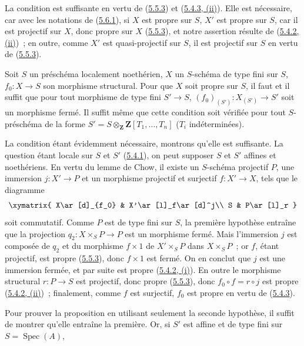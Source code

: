La condition est suffisante en vertu de (\hyperref[II.5.5.3-fr]{5.5.3}) et
(\hyperref[II.5.4.3-fr]{5.4.3, (ii)}). Elle est nécessaire, car avec les
notations de (\hyperref[II.5.6.1-fr]{5.6.1}), si $X$ est propre sur $S$, $X'$
est propre sur $S$, car il est projectif sur $X$, donc propre sur $X$
(\hyperref[II.5.5.3-fr]{5.5.3}), et notre assertion résulte de
(\hyperref[II.5.4.2-fr]{5.4.2, (ii)})~; en outre, comme $X'$ est
quasi-projectif sur $S$, il est projectif sur $S$ en vertu de
(\hyperref[II.5.5.3-fr]{5.5.3}).

\begin{corollary}[5.6.3]
\label{II.5.6.3-fr}
Soit $S$ un préschéma localement noethérien, $X$ un $S$-schéma de type fini
sur $S$, $f_0:X\to S$ son morphisme structural. Pour que $X$ soit propre sur
$S$, il faut et il suffit que pour tout morphisme de type fini $S'\to S$,
$(f_0)_{(S')}:X_{(S')}\to S'$ soit un morphisme fermé. Il suffit même que
cette condition soit vérifiée pour tout $S$-préschéma de la forme
$S'=S\otimes_{\mathbf Z}\mathbf Z[T_1,\ldots,T_n]$ ($T_i$ indéterminées).
\end{corollary}

La condition étant évidemment nécessaire, montrons qu'elle est suffisante.
La question étant locale sur $S$ et $S'$ (\hyperref[II.5.4.1-fr]{5.4.1}), on
peut supposer $S$ et $S'$ affines et noethériens. En vertu du lemme de Chow,
il existe un $S$-schéma projectif $P$, une immersion $j:X'\to P$ et un
morphisme projectif et surjectif $f:X'\to X$, tels que le diagramme
\[
\xymatrix{
X\ar[d]_{f_0} & X'\ar[l]_f\ar[d]^j\\
S & P\ar[l]_r
}
\]
soit commutatif. Comme $P$ est de type fini sur $S$, la première hypothèse
entraîne que la projection $q_2:X\times_SP\to P$ est un morphisme fermé. Mais
l'immersion $j$ est composée de $q_2$ et du morphisme $f\times1$ de
$X'\times_SP$ dans $X\times_SP$~; or $f$, étant projectif, est propre
(\hyperref[II.5.5.3-fr]{5.5.3}), donc $f\times1$ est fermé. On en conclut que
$j$ est une immersion fermée, et par suite est propre
(\hyperref[II.5.4.2-fr]{5.4.2, (i)}). En outre le morphisme structural
$r:P\to S$ est projectif, donc propre (\hyperref[II.5.5.3-fr]{5.5.3}), donc
$f_0\circ f=r\circ j$ est propre
(\hyperref[II.5.4.2-fr]{5.4.2, (ii)})~; finalement, comme $f$ est surjectif,
$f_0$ est propre en vertu de (\hyperref[II.5.4.3-fr]{5.4.3}).

Pour prouver la proposition en utilisant seulement la seconde hypothèse, il
suffit de montrer qu'elle entraîne la première. Or, si $S'$ est affine et de
type fini sur $S=\operatorname{Spec}(A)$,

